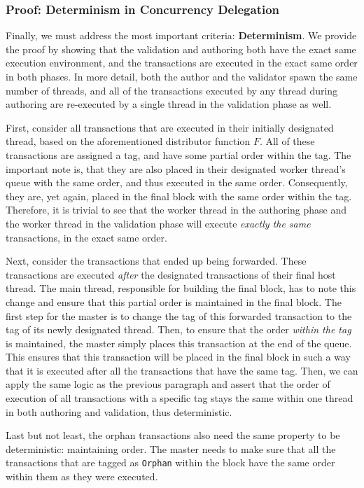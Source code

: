\subsubsection{Proof: Determinism in Concurrency Delegation}

Finally, we must address the most important criteria: \textbf{Determinism}. We provide the proof by
showing that the validation and authoring both have the exact same execution environment, and the
transactions are executed in the exact same order in both phases. In more detail, both the author and the
validator spawn the same number of threads, and all of the transactions executed by any
thread during authoring are re-executed by a single thread in the validation phase as well.

First, consider all transactions that are executed in their initially designated thread, based on
the aforementioned distributor function $F$. All of these transactions are assigned a tag, and have
some partial order within the tag. The important note is, that they are also placed in their
designated worker thread's queue with the same order, and thus executed in the same order.
Consequently, they are, yet again, placed in the final block with the same order within the tag.
Therefore, it is trivial to see that the worker thread in the authoring phase and the worker thread
in the validation phase will execute \textit{exactly the same} transactions, in the exact same
order.

Next, consider the transactions that ended up being forwarded. These transactions are
executed \textit{after} the designated transactions of their final host thread. The main thread,
responsible for building the final block, has to note this change and ensure that this partial
order is maintained in the final block. The first step for the master is to change the tag of this
forwarded transaction to the tag of its newly designated thread. Then, to ensure that the order
\textit{within the tag} is maintained, the master simply places this transaction at the end
of the queue. This ensures that this transaction will be placed in the final block in such a way
that it is executed after all the transactions that have the same tag. Then, we can apply the same
logic as the previous paragraph and assert that the order of execution of all transactions with a
specific tag stays the same within one thread in both authoring and validation, thus deterministic.

Last but not least, the orphan transactions also need the same property to be deterministic:
maintaining order. The master needs to make sure that all the transactions that are tagged as
\texttt{Orphan} within the block have the same order within them as they were executed.

